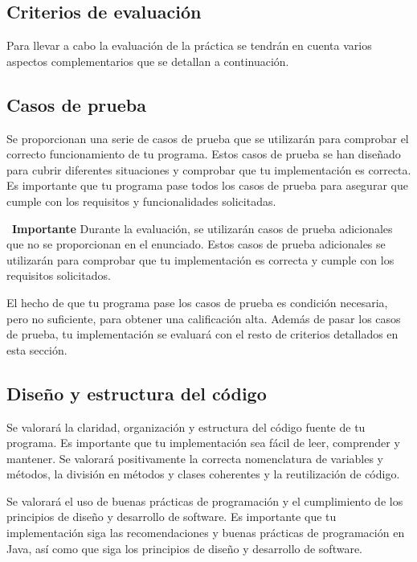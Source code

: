 \documentclass[
    a4paper, %
    12pt, %
]{CSSullivanBusinessReport}
\begin{document}
\newpage
\begin{twothirdswidth}
\section{Criterios de evaluación}\label{sec:criterios-evaluacion}

Para llevar a cabo la evaluación de la práctica se tendrán en cuenta varios aspectos complementarios que se detallan a continuación.

\subsection{Casos de prueba}\label{sec:criterios-casos-prueba}

Se proporcionan una serie de casos de prueba que se utilizarán para comprobar el correcto funcionamiento de tu programa. Estos casos de prueba se han diseñado para cubrir diferentes situaciones y comprobar que tu implementación es correcta. Es importante que tu programa pase todos los casos de prueba para asegurar que cumple con los requisitos y funcionalidades solicitadas.

\faExclamation~\textbf{Importante} Durante la evaluación, se utilizarán casos de prueba adicionales que no se proporcionan en el enunciado. Estos casos de prueba adicionales se utilizarán para comprobar que tu implementación es correcta y cumple con los requisitos solicitados.

El hecho de que tu programa pase los casos de prueba es condición necesaria, pero no suficiente, para obtener una calificación alta. Además de pasar los casos de prueba, tu implementación se evaluará con el resto de criterios detallados en esta sección.

\subsection{Diseño y estructura del código}\label{sec:criterios-diseno}

Se valorará la claridad, organización y estructura del código fuente de tu programa. Es importante que tu implementación sea fácil de leer, comprender y mantener. Se valorará positivamente la correcta nomenclatura de variables y métodos, la división en métodos y clases coherentes y la reutilización de código.

Se valorará el uso de buenas prácticas de programación y el cumplimiento de los principios de diseño y desarrollo de software. Es importante que tu implementación siga las recomendaciones y buenas prácticas de programación en Java, así como que siga los principios de diseño y desarrollo de software.


\end{twothirdswidth}
\end{document}
